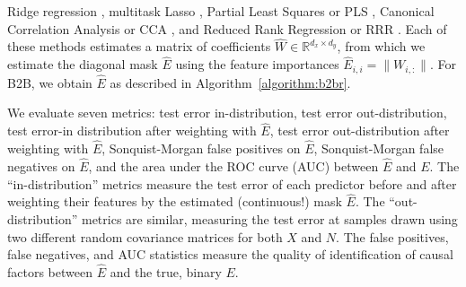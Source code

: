 \iffalse Ridge regression \citep{hoerl1959optimum}, multitask Lasso
\citep{argyriou2008convex}, Partial Least Squares or PLS \citep{wold_pls,
tenenhaus_pls}, Canonical Correlation Analysis or CCA \citep{cca_hotelling}, and
Reduced Rank Regression or RRR \citep{Izenman_rrr}.
%
Each of these methods estimates a matrix of coefficients $\hat{W} \in
\mathbb{R}^{d_x \times d_y}$, from which we estimate the diagonal mask $\hat{E}$
using the feature importances $\hat{E}_{i,i} = \| W_{i, :} \|$.
%
For B2B, we obtain $\hat{E}$ as described in Algorithm~\ref{algorithm:b2br}.
%


We evaluate seven metrics:
%
test error in-distribution, test error out-distribution, test error-in
distribution after weighting with $\hat{E}$, test error out-distribution after
weighting with $\hat{E}$, Sonquist-Morgan false positives on $\hat{E}$,
Sonquist-Morgan false negatives on $\hat{E}$, and the area under the ROC curve
(AUC) between $\hat{E}$ and $E$.
%
The ``in-distribution'' metrics measure the test error of each predictor before
and after weighting their features by the estimated (continuous!) mask
$\hat{E}$.
%
The ``out-distribution'' metrics are similar, measuring the test error at
samples drawn using two different random covariance matrices for both $X$ and
$N$.
%
The false positives, false negatives, and AUC statistics measure the quality of
identification of causal factors between $\hat{E}$ and the true, binary $E$.

